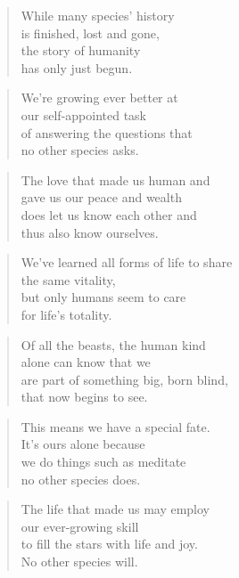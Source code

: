 \documentclass[10pt,a4paper]{article}
\begin{document}
\begin{paracol}{2}
\begin{verse}
While many species’ history\\
is finished, lost and gone,\\
the story of humanity\\
has only just begun.
\end{verse}

\begin{verse}
We’re growing ever better at\\
our self-appointed task\\
of answering the questions that\\
no other species asks.
\end{verse}

\begin{verse}
The love that made us human and\\
gave us our peace and wealth\\
does let us know each other and\\
thus also know ourselves.
\end{verse}

\begin{verse}
We’ve learned all forms of life to share\\
the same vitality,\\
but only humans seem to care\\
for life’s totality.
\end{verse}

\begin{verse}
Of all the beasts, the human kind\\
alone can know that we\\
are part of something big, born blind,\\
that now begins to see.
\end{verse}

\begin{verse}
This means we have a special fate.\\
It’s ours alone because\\
we do things such as meditate\\
no other species does.
\end{verse}

\begin{verse}
The life that made us may employ\\
our ever-growing skill\\
to fill the stars with life and joy.\\
No other species will.
\end{verse}


\end{paracol}
\end{document}
